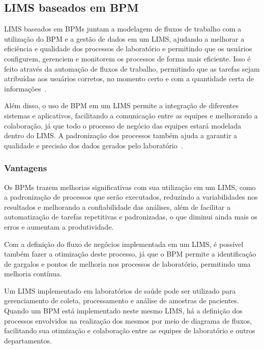 \subsection{LIMS baseados em BPM}


LIMS baseados em BPMs juntam a modelagem de fluxos de trabalho com a utilização do BPM e a gestão de dados em um LIMS, ajudando a melhorar a eficiência e qualidade dos processos de laboratório e permitindo que os usuários configurem, gerenciem e monitorem os processos de forma mais eficiente. Isso é feito através da automação de fluxos de trabalho, permitindo que as tarefas sejam atribuídas aos usuários corretos, no momento certo e com a quantidade certa de informações~\cite{LIMS-BPMSLaboratory, LIMS-BPMSLaboratoryb}.

Além disso, o uso de BPM em um LIMS permite a integração de diferentes sistemas e aplicativos, facilitando a comunicação entre as equipes e melhorando a colaboração, já que todo o processo de negócio das equipes estará modelada dentro do LIMS. A padronização dos processos também ajuda a garantir a qualidade e precisão dos dados gerados pelo laboratório~\cite{LIMS-BPMSLaboratory, LIMS-BPMSLaboratoryb}.


\subsubsection{Vantagens}

Os BPMs trazem melhorias significativas com sua utilização em um LIMS, como a padronização de processos que serão executados, reduzindo a variabilidades nos resultados e melhorando a confiabilidade das análises, além de facilitar a automatização de tarefas repetitivas e padronizadas, o que diminui ainda mais os erros e aumentam a produtividade. \R

Com a definição do fluxo de negócios implementada em um LIMS, é possível também fazer a otimização deste processo, já que o BPM permite a identificação de gargalos e pontos de melhoria nos processos de laboratório, permitindo uma melhoria contínua. \R

Um LIMS implementado em laboratórios de saúde pode ser utilizado para gerenciamento de coleta, processamento e análise de amostras de pacientes. Quando um BPM está implementado neste mesmo LIMS, há a definição dos processos envolvidos na realização dos mesmos por meio de diagrama de fluxos, facilitando sua otimização e colaboração entre as equipes de laboratório e outros departamentos. \R

